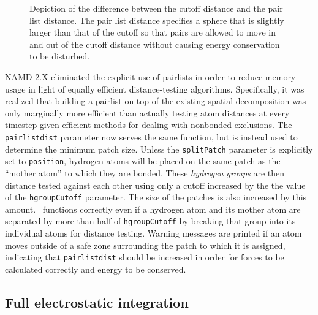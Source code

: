 \begin{figure}[htb]
  \caption[Example of cutoff and pairlist distance uses]
  {{\small Depiction of the difference between the cutoff distance and the
  pair list distance.  The pair list distance specifies a sphere that is
  slightly larger than that of the cutoff so that pairs are allowed to
  move in and out of the cutoff distance without causing energy conservation
  to be disturbed.}}
  \label{fig:pairlistdist}
\end{figure}

NAMD 2.X eliminated the explicit use of pairlists in order to reduce memory usage in light of equally efficient distance-testing algorithms.
Specifically, it was realized that building a pairlist on top of the existing spatial decomposition was only marginally more efficient than actually testing atom distances at every timestep given efficient methods for dealing with nonbonded exclusions.
The \verb!pairlistdist! parameter now serves the same function, but is instead used to determine the minimum patch size.
Unless the \verb!splitPatch! parameter is explicitly set to \verb!position!, hydrogen atoms will be placed on the same patch as the ``mother atom'' to which they are bonded.
These {\em hydrogen groups} are then distance tested against each other using only a cutoff increased by the the value of the \verb!hgroupCutoff! parameter.
The size of the patches is also increased by this amount.
\NAMD\ functions correctly even if a hydrogen atom and its mother atom are separated by more than half of \verb!hgroupCutoff! by breaking that group into its individual atoms for distance testing.
Warning messages are printed if an atom moves outside of a safe zone surrounding the patch to which it is assigned, indicating that \verb!pairlistdist! should be increased in order for forces to be calculated correctly and energy to be conserved.

\subsection{Full electrostatic integration}
\label{section:fmadesc}

